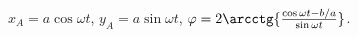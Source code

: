 $x_A = a\cos{\omega t}$, $y_A = a\sin{\omega t}$,
$\varphi = 2\arcctg{\frac{\cos{\omega t} - b/a}{\sin{\omega t}}}$.
